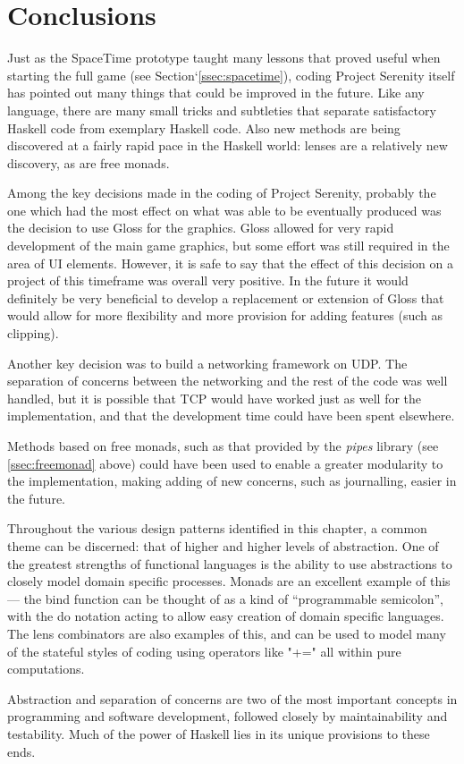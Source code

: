 \section{Conclusions}
\label{sec:guideconc}


Just as the SpaceTime prototype taught many lessons that proved useful when starting the full game (see Section`\ref{ssec:spacetime}), coding Project Serenity itself has pointed out many things that could be improved in the future. Like any language, there are many small tricks and subtleties that separate satisfactory Haskell code from exemplary Haskell code. Also new methods are being discovered at a fairly rapid pace in the Haskell world: lenses are a relatively new discovery, as are free monads. 

Among the key decisions made in the coding of Project Serenity, probably the one which had the most effect on what was able to be eventually produced was the decision to use Gloss for the graphics. Gloss allowed for very rapid development of the main game graphics, but some effort was still required in the area of UI elements. However, it is safe to say that the effect of this decision on a project of this timeframe was overall very positive. In the future it would definitely be very beneficial to develop a replacement or extension of Gloss that would allow for more flexibility and more provision for adding features (such as clipping). 

Another key decision was to build a networking framework on UDP. The separation of concerns between the networking and the rest of the code was well handled, but it is possible that TCP would have worked just as well for the implementation, and that the development time could have been spent elsewhere. 

Methods based on free monads, such as that provided by the \emph{pipes} library (see \ref{ssec:freemonad} above) could have been used to enable a greater modularity to the implementation, making adding of new concerns, such as journalling, easier in the future. 

Throughout the various design patterns identified in this chapter, a common theme can be discerned: that of higher and higher levels of abstraction. One of the greatest strengths of functional languages is the ability to use abstractions to closely model domain specific processes. Monads are an excellent example of this --- the bind function can be thought of as a kind of ``programmable semicolon'', with the do notation acting to allow easy creation of domain specific languages. The lens combinators are also examples of this, and can be used to model many of the stateful styles of coding using operators like "+=" all within pure computations. 

Abstraction and separation of concerns are two of the most important concepts in programming and software development, followed closely by maintainability and testability. Much of the power of Haskell lies in its unique provisions to these ends.

